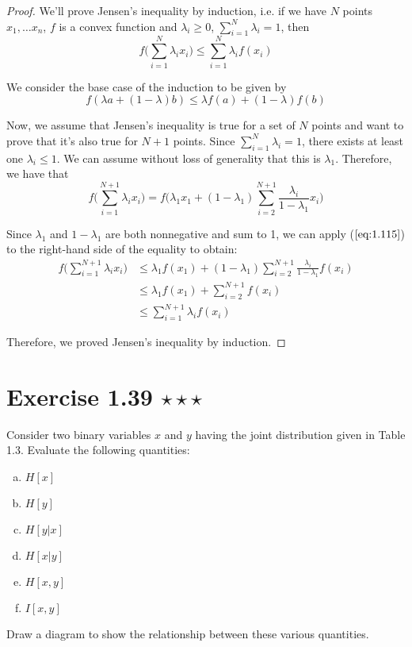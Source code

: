 \begin{proof}
    We'll prove Jensen's inequality by induction, i.e.
    if we have $N$ points $x_1, \ldots x_n$, $f$ is a convex function and $\lambda_i \geq 0$, 
    $\displaystyle \sum_{i=1}^{N} \lambda_i = 1$, then
    \begin{equation}\label{eq:1.115}\tag{1.115}
        f\bigg(\sum_{i=1}^{N} \lambda_i x_i\bigg) \leq \sum_{i=1}^{N} \lambda_i f(x_i)
    \end{equation}

    We consider the base case of the induction to be given by
    \begin{equation}\label{eq:1.114}\tag{1.114}
        f(\lambda a + (1 - \lambda)b) \leq \lambda f(a) + (1 - \lambda) f(b)
    \end{equation}

    Now, we assume that Jensen's inequality is true for a
    set of $N$ points and want to prove that it's also true for
    $N + 1$ points. Since $\displaystyle \sum_{i=1}^{N} \lambda_i = 1$,
    there exists at least one $\lambda_i \leq 1$. We can assume
    without loss of generality that this is $\lambda_1$.
    Therefore, we have that
    \[
        f\bigg(\sum_{i=1}^{N+1} \lambda_i x_i\bigg)
        = f\bigg(\lambda_1 x_1 + (1 - \lambda_1) \sum_{i=2}^{N+1} \frac{\lambda_i}{1 - \lambda_1} x_i\bigg)
    \] 

    Since $\lambda_1$ and $1 - \lambda_1$ are both nonnegative and sum to 1,
    we can apply ($\ref{eq:1.115}$) to the right-hand side of the equality to obtain:
    \begin{align*}
        f\bigg(\sum_{i=1}^{N+1} \lambda_i x_i\bigg)
        &\leq \lambda_1 f(x_1) + (1 - \lambda_1) \sum_{i=2}^{N+1} \frac{\lambda_i}{1 - \lambda_1} f(x_i) \\
        &\leq \lambda_1 f(x_1) + \sum_{i=2}^{N+1} f(x_i) \\
        &\leq \sum_{i=1}^{N+1} \lambda_i f(x_i) \tag{1.115}
    \end{align*}

    Therefore, we proved Jensen's inequality by induction.
\end{proof}

\section*{Exercise 1.39 $\star \star \star$}
Consider two binary variables $x$ and $y$ having the joint distribution
given in Table 1.3. Evaluate the following quantities:
\begin{multicols}{3}
    \begin{enumerate}[(a)]
        \item $H[x]$
        \item $H[y]$
        \item $H[y | x]$
        \item $H[x | y]$
        \item $H[x, y]$
        \item $I[x, y]$
    \end{enumerate}
\end{multicols}
Draw a diagram to show the relationship between these various quantities.

